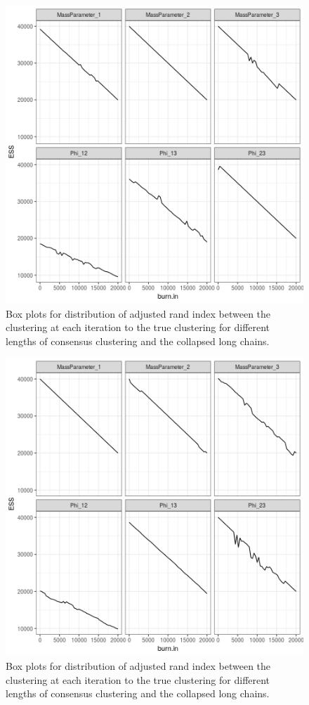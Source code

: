\documentclass[12pt]{article} %
\begin{document}
\begin{figure}[h]
	\centering
	\includegraphics[scale=0.65]{Images/Gen_data/Case_1/Esimated_burn_in_plot_8.png}
	\caption{Box plots for distribution of adjusted rand index between the clustering at each iteration to the true clustering for different lengths of consensus clustering and the collapsed long chains.}
	\label{fig:case_1_esimated_burn_in_plot_8}
\end{figure}

\newpage

\begin{figure}[h]
	\centering
	\includegraphics[scale=0.65]{Images/Gen_data/Case_1/Esimated_burn_in_plot_9.png}
	\caption{Box plots for distribution of adjusted rand index between the clustering at each iteration to the true clustering for different lengths of consensus clustering and the collapsed long chains.}
	\label{fig:case_1_esimated_burn_in_plot_9}
\end{figure}
\end{document}
